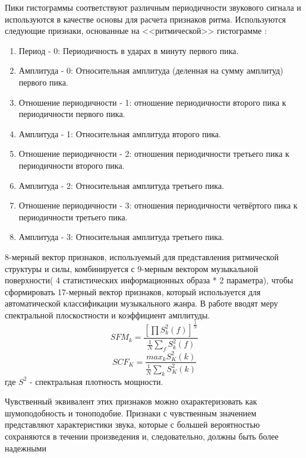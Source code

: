 Пики гистограммы соответствуют различным периодичности звукового сигнала и используются в качестве основы для расчета признаков ритма. Используются следующие признаки, основанные на <<ритмической>> гистограмме :
\begin{enumerate}[label=\arabic*.]
\item Период - 0: Периодичность в ударах в минуту первого пика. 
\item Амплитуда - 0: Относительная амплитуда (деленная на сумму амплитуд) первого пика.
\item Отношение периодичности - 1: отношение периодичности второго пика к периодичности первого пика.
\item Амплитуда - 1: Относительная амплитуда второго пика.
\item Отношение периодичности - 2: отношения периодичности третьего пика к периодичности второго пика.
\item Амплитуда - 2: Относительная амплитуда третьего пика.
\item Отношение периодичности - 3: отношения периодичности четвёртого пика к периодичности третьего пика.
\item Амплитуда - 3: Относительная амплитуда третьего пика.
\end{enumerate}

8-мерный вектор признаков, используемый для представления ритмической структуры и силы, комбинируется с 9-мерным вектором музыкальной поверхности( 4 статистических информационных образа * 2 параметра), чтобы сформировать 17-мерный вектор признаков, который используется для автоматической классификации музыкального жанра.
В работе \cite{src2}  вводят меру спектральной плоскостности и коэффициент амплитуды.
\begin{equation}\label{eq:sfm}
SFM_k = \frac{[\prod S^2_k(f)]^{\frac{1}{N}} }{\frac{1}{N} \sum_f S^2_k(f)}	
\end{equation}
\begin{equation}\label{eq:scf}
SCF_K =  \frac{max_k S^2_K(k)}{\frac{1}{N} \sum_k S^2_K(k)}
\end{equation}
где $ S^2 $ - спектральная плотность мощности.

Чувственный эквивалент этих признаков можно охарактеризовать как шумоподобность и тоноподобие. Признаки с чувственным значением представляют характеристики звука, которые с большей вероятностью сохраняются в течении произведения и, следовательно, должны быть более надежными 

